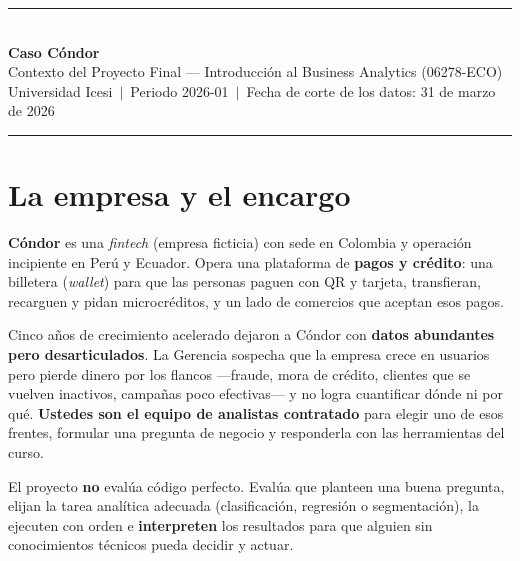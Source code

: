 \documentclass[11pt,letterpaper]{article}
\begin{document}
\thispagestyle{fancy}

\begin{center}
  {\color{naranja}\rule{\textwidth}{1.2pt}}\\[4pt]
  {\LARGE\bfseries\color{azulcurso} Caso Cóndor}\\[2pt]
  {\normalsize\color{azulmedio} Contexto del Proyecto Final --- Introducción al Business Analytics (06278-ECO)}\\[3pt]
  {\footnotesize Universidad Icesi\ $|$\ Periodo 2026-01\ $|$\ Fecha de corte de los datos: 31 de marzo de 2026}\\[3pt]
  {\color{naranja}\rule{\textwidth}{1.2pt}}
\end{center}

\vspace{2pt}

\section{La empresa y el encargo}

\textbf{Cóndor} es una \textit{fintech} (empresa ficticia) con sede en Colombia y operación incipiente en Perú y Ecuador. Opera una plataforma de \textbf{pagos y crédito}: una billetera (\textit{wallet}) para que las personas paguen con QR y tarjeta, transfieran, recarguen y pidan microcréditos, y un lado de comercios que aceptan esos pagos.

Cinco años de crecimiento acelerado dejaron a Cóndor con \textbf{datos abundantes pero desarticulados}. La Gerencia sospecha que la empresa crece en usuarios pero pierde dinero por los flancos ---fraude, mora de crédito, clientes que se vuelven inactivos, campañas poco efectivas--- y no logra cuantificar dónde ni por qué. \textbf{Ustedes son el equipo de analistas contratado} para elegir uno de esos frentes, formular una pregunta de negocio y responderla con las herramientas del curso.

\begin{cajaclave}
El proyecto \textbf{no} evalúa código perfecto. Evalúa que planteen una buena pregunta, elijan la tarea analítica adecuada (clasificación, regresión o segmentación), la ejecuten con orden e \textbf{interpreten} los resultados para que alguien sin conocimientos técnicos pueda decidir y actuar.
\end{cajaclave}

\end{document}
